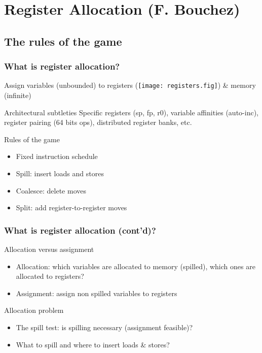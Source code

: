   
\section{Register Allocation (F. Bouchez)}

\subsection*{The rules of the game}
\begin{frame}
  \frametitle{What is register allocation?}
    \begin{block}{Assign variables (unbounded) to}
       registers (\texttt{[image: registers.fig]}) \& memory (infinite)
    \end{block}
   \begin{block}{Architectural subtleties}
        Specific registers (sp, fp, r0), variable affinities (auto-inc), register pairing (64 bits
          ops), distributed register banks, etc.
    \end{block}
   \begin{minipage}{0.7\textwidth}
    \begin{block}{Rules of the game}
      \begin{itemize}
        \item Fixed instruction schedule
        \item \alert{Spill}: insert {\sc loads} and {\sc stores}
        \item \alert{Coalesce}: delete {\sc moves}
        \item \alert{Split}: add register-to-register {\sc moves}
      \end{itemize}
    \end{block}
   \end{minipage}
\end{frame}

\begin{frame}
  \frametitle{What is register allocation (cont'd)?}
  \begin{block}{Allocation versus assignment}
    \begin{itemize}
      \item Allocation: which variables are allocated to memory (spilled), which ones are allocated to registers?
      \item Assignment: assign non spilled variables to registers
    \end{itemize}
  \end{block}
  \begin{block}{Allocation problem}
    \begin{itemize}
      \item \alert<3>{The spill test:} is spilling necessary (assignment feasible)?
      \item \alert<2>{What to spill and where to insert loads \& stores?}
    \end{itemize}
  \end{block}
\end{frame}


